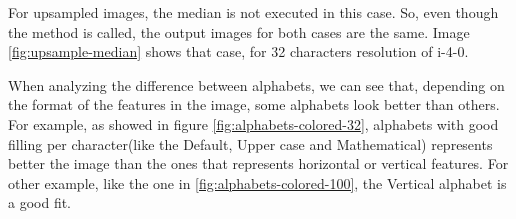 \documentclass[]{IEEEtran}
\begin{document}

For upsampled images, the median is not executed in this case. So, even though the method is called, the output images for both cases are the same. Image \ref{fig:upsample-median} shows that case, for 32 characters resolution of i-4-0.


When analyzing the difference between alphabets, we can see that, depending on the format of the features in the image, some alphabets look better than others. For example, as showed in figure \ref{fig:alphabets-colored-32}, alphabets with good filling per character(like the Default, Upper case and Mathematical) represents better the image than the ones that represents horizontal or vertical features. For other example, like the one in \ref{fig:alphabets-colored-100}, the Vertical alphabet is a good fit. 

\end{document}
